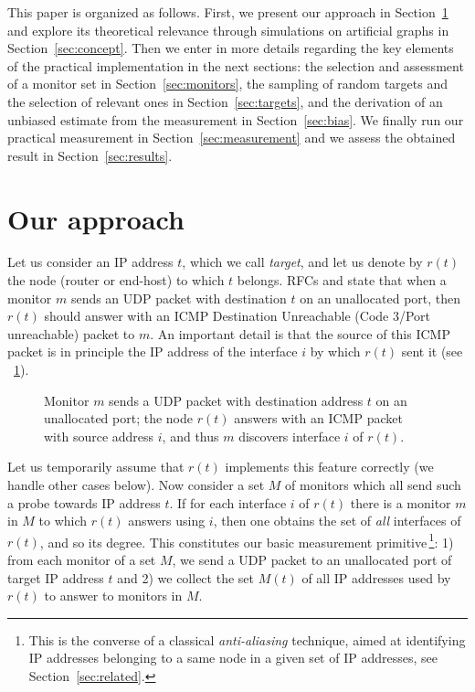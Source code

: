 \documentclass[conference]{IEEEtran}
\begin{document}
This paper is organized as follows. First, we present our approach in Section~\ref{sec:approach} and explore its theoretical relevance through simulations on artificial graphs in Section~\ref{sec:concept}. Then we enter in more details regarding the key elements of the practical implementation in the next sections: the selection and assessment of a monitor set in Section~\ref{sec:monitors}, the sampling of random targets and the selection of relevant ones in Section~\ref{sec:targets}, and the derivation of an unbiased estimate from the measurement in Section~\ref{sec:bias}. We finally run our practical measurement in Section~\ref{sec:measurement} and we assess the obtained result in Section~\ref{sec:results}.


\section{Our approach}\label{sec:approach}

Let us consider an IP address $t$, which we call {\em target}, and let us denote by $r(t)$ the node (router or end-host) to which $t$ belongs. RFCs \cite{rfc1122} and \cite{rfc1812} state that when a monitor $m$ sends an UDP packet with destination $t$ on an unallocated port, then $r(t)$ should answer with an ICMP Destination Unreachable (Code 3/Port unreachable) packet to $m$. An important detail is that the source of this ICMP packet is in principle the IP address of the interface $i$ by which $r(t)$ sent it (see \figurename~\ref{fig:ping-udp}).

\begin{figure} \centering
\resizebox{.6\columnwidth}{!}{}
\caption{Monitor $m$ sends a UDP packet with destination address $t$ on an unallocated port; the node $r(t)$ answers with an ICMP packet with source address $i$, and thus $m$ discovers interface $i$ of $r(t)$.}
\label{fig:ping-udp}
\end{figure}

Let us temporarily assume that $r(t)$ implements this feature correctly (we handle other cases below). Now consider a set $M$ of monitors which all send such a probe towards IP address $t$. If for each interface $i$ of $r(t)$ there is a monitor $m$ in $M$ to which $r(t)$ answers using $i$, then one obtains the set of {\em all} interfaces of $r(t)$, and so its degree. This constitutes our basic measurement primitive\,\footnote{This is the converse of a classical {\em anti-aliasing} technique, aimed at identifying IP addresses belonging to a same node in a given set of IP addresses, see Section~\ref{sec:related}.}: 1) from each monitor of a set $M$, we send a UDP packet to an unallocated port of target IP address $t$ and 2) we collect the set $M(t)$ of all IP addresses used by $r(t)$ to answer to monitors in $M$.
\end{document}
